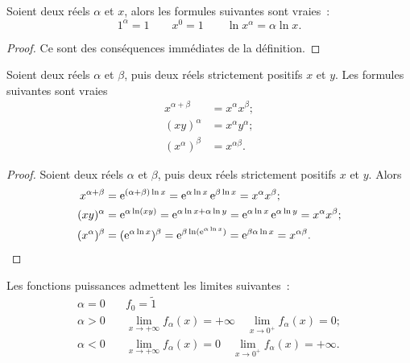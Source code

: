 \begin{prop}
  Soient deux réels \(\alpha\) et \(x\), alors les formules suivantes sont 
  vraies~:
  \begin{equation}
    1^{\alpha} = 1 \qquad x^0 = 1 \qquad \ln x^{\alpha} = \alpha \ln x.
  \end{equation}
\end{prop}

\begin{proof}
  Ce sont des conséquences immédiates de la définition.
\end{proof}

\begin{prop}
  Soient deux réels \(\alpha\) et \(\beta\), puis deux réels strictement 
  positifs \(x\) et \(y\). Les formules suivantes sont vraies
  \begin{align*}
    x^{\alpha+\beta} &= x^\alpha x^\beta;\\
    (xy)^\alpha &= x^\alpha y^\alpha;\\
    (x^\alpha)^\beta &= x^{\alpha\beta}.
  \end{align*}
\end{prop}

\begin{proof}
  Soient deux réels \(\alpha\) et \(\beta\), puis deux réels strictement 
  positifs \(x\) et \(y\). Alors
  \begin{align*}
    x^{\alpha+\beta} & = \operatorname{e}^{(\alpha+\beta)\ln x} = \operatorname{e}^{\alpha \ln x} \operatorname{e}^{\beta 
    \ln x} = x^\alpha x^\beta;\\
      (xy)^\alpha & = \operatorname{e}^{\alpha \ln (xy)} = \operatorname{e}^{\alpha \ln x +\alpha \ln y} = 
      \operatorname{e}^{\alpha \ln x} \operatorname{e}^{\alpha \ln y} = x^\alpha x^\beta ;\\
      (x^\alpha)^\beta & = (\operatorname{e}^{\alpha \ln x})^\beta = \operatorname{e}^{\beta \ln(\operatorname{e}^{\alpha 
      \ln x})} = \operatorname{e}^{\beta \alpha \ln x} = x^{\alpha \beta}.
        \end{align*}
      \end{proof}

      Les fonctions puissances admettent les limites suivantes~:
      \begin{align*}
        \alpha = 0 &\quad f_0 = \tilde{1} \\
        \alpha>0 &\quad \lim\limits_{x \to +\infty} f_\alpha(x) = +\infty \quad 
        \lim\limits_{x \to 0^{+}} f_\alpha(x) = 0;\\
        \alpha<0 &\quad \lim\limits_{x \to +\infty} f_\alpha(x) = 0 \quad 
        \lim\limits_{x \to 0^{+}} f_\alpha(x) = +\infty.
      \end{align*}

